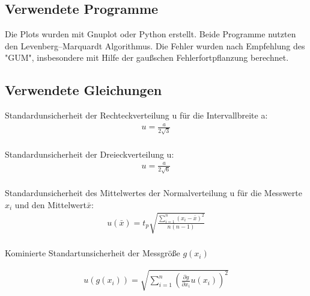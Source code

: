 \subsection{Verwendete Programme}
Die Plots wurden mit Gnuplot oder Python erstellt. Beide Programme nutzten den  Levenberg–Marquardt Algorithmus. Die Fehler wurden nach Empfehlung des "GUM", insbesondere mit Hilfe der gaußschen Fehlerfortpflanzung berechnet.

\subsection{Verwendete Gleichungen}\label{VGuD}









Standardunsicherheit der Rechteckverteilung u für die Intervallbreite a:
\begin{align}
	u=\frac{a}{2\sqrt{3}}\label{eq:sur}
\end{align} \\
Standardunsicherheit der Dreieckverteilung u: \begin{align}
	u=\frac{a}{2\sqrt{6}}\label{eq:sud}
\end{align}\\
Standardunsicherheit des Mittelwertes der Normalverteilung u für die Messwerte $x_i$ und den Mittelwert$\bar{x}$:
\begin{align}
	u(\bar{x})=  t_p  \sqrt{  \frac{\sum_{i=1}^{n}  (x_i-\bar{x})^2} {n (n-1)} }
	\label{eq:sunv}       
\end{align} \\
Kominierte Standartunsicherheit der Messgröße $g(x_i)$

\begin{align}
	u(g(x_i))=   \sqrt{  \sum_{i=1}^{n} \left( \frac{\partial g}{\partial x_i} u(x_i) \right)^2  }
	\label{eq:kombsu}       
\end{align}\\

